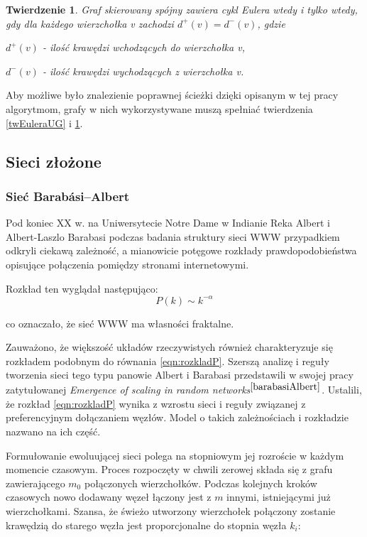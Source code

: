 \documentclass[a4paper, 12pt, twoside, openright]{article}
\newtheorem{theorem}{Twierdzenie}
\begin{document}
	 \begin{theorem}
	 	\label{twEuleraDG}
	 	Graf skierowany spójny zawiera cykl Eulera wtedy i tylko wtedy, gdy
	 	dla każdego wierzchołka v zachodzi $d ^{+} (v) = d ^{-} (v) $, gdzie \indent\par$d ^{+} (v)$ - ilość krawędzi wchodzących do wierzchołka v, \indent\par$d ^{-} (v)$ - ilość krawędzi wychodzących z wierzchołka v.
	 \end{theorem}
 
	 Aby możliwe było znalezienie poprawnej ścieżki dzięki opisanym w tej pracy algorytmom, grafy w nich wykorzystywane muszą spełniać twierdzenia \ref{twEuleraUG} i \ref{twEuleraDG}. 
	 

\subsection{Sieci złożone} \label{SieciZlozone}
\subsubsection{Sieć Barabási–Albert}\label{BarabasiAlbert}
\indent\par

 	Pod koniec XX w. na Uniwersytecie Notre Dame w Indianie Reka Albert i Albert-Laszlo Barabasi podczas badania struktury sieci WWW przypadkiem odkryli ciekawą zależność, a mianowicie potęgowe rozkłady prawdopodobieństwa opisujące połączenia pomiędzy stronami internetowymi.
 
	 Rozkład ten wyglądał następująco:
 	\begin{equation}
 		\label{eqn:rozkladP}
 		P(k) \sim k ^{-\alpha}
 	\end{equation}
 
 	co oznaczało, że sieć WWW ma własności fraktalne.

 	Zauważono, że większość układów rzeczywistych również charakteryzuje się rozkładem podobnym do równania \ref{eqn:rozkladP}. Szerszą analizę i reguły tworzenia sieci tego typu panowie Albert i Barabasi przedstawili w swojej pracy zatytułowanej \textit{Emergence of scaling in random networks}$^{\cite{barabasiAlbert}}$. Ustalili, że rozkład \ref{eqn:rozkladP} wynika z wzrostu sieci i reguły związanej z preferencyjnym dołączaniem węzłów. Model o takich zależnościach i rozkładzie nazwano na ich część.
 	
 
	Formułowanie ewoluującej sieci polega na stopniowym jej rozroście w każdym momencie czasowym. Proces rozpoczęty w chwili zerowej składa się z grafu zawierającego $m_0$ połączonych wierzchołków. Podczas kolejnych kroków czasowych nowo dodawany węzeł łączony jest z $m$ innymi, istniejącymi już wierzchołkami.	Szansa, że świeżo utworzony wierzchołek połączony zostanie krawędzią do starego węzła jest proporcjonalne do stopnia węzła $k_i$:
	
\end{document}
